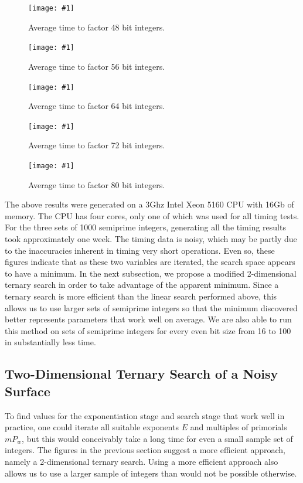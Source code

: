 \documentclass{ucalgthes1}
\theoremstyle{definition}
\newcommand{\mygraphXPNG}[4]{
	\begin{figure}[htb]
	\centering
	\texttt{[image: \#1]}
	\caption[#4]{#3}
	\label{#2}
	\end{figure}
}
\begin{document}
\mygraphXPNG{bits-48-3d.png}{fig:search48td}{Average time to factor 48 bit integers.}{48 bit Factoring Search Space.}
\mygraphXPNG{bits-56-3d.png}{fig:search56td}{Average time to factor 56 bit integers.}{56 bit Factoring Search Space.}
\mygraphXPNG{bits-64-3d.png}{fig:search64td}{Average time to factor 64 bit integers.}{64 bit Factoring Search Space.}
\mygraphXPNG{bits-72-3d.png}{fig:search72td}{Average time to factor 72 bit integers.}{72 bit Factoring Search Space.}
\mygraphXPNG{bits-80-3d.png}{fig:search80td}{Average time to factor 80 bit integers.}{80 bit Factoring Search Space.}

\clearpage

The above results were generated on a 3Ghz Intel Xeon 5160 CPU with 16Gb of memory.  The CPU has four cores, only one of which was used for all timing tests.  For the three sets of 1000 semiprime integers, generating all the timing results took approximately one week.  The timing data is noisy, which may be partly due to the inaccuracies inherent in timing very short operations.  Even so, these figures indicate that as these two variables are iterated, the search space appears to have a minimum.  In the next subsection, we propose a modified 2-dimensional ternary search in order to take advantage of the apparent minimum.  Since a ternary search is more efficient than the linear search performed above, this allows us to use larger sets of semiprime integers so that the minimum discovered better represents parameters that work well on average.  We are also able to run this method on sets of semiprime integers for every even bit size from 16 to 100 in substantially less time.



\subsection{Two-Dimensional Ternary Search of a Noisy Surface}
\label{subsec:ssparNoisyCurve}

\newcommand{\xmin}{x_{\textrm{min}}}
\newcommand{\xmax}{x_{\textrm{max}}}
\newcommand{\xlo}{x_{\textrm{lo}}}
\newcommand{\xhi}{x_{\textrm{hi}}}
\newcommand{\xonethird}{x_\ell}
\newcommand{\xtwothird}{x_h}
\newcommand{\ymin}{y_{\textrm{min}}}
\newcommand{\ymax}{y_{\textrm{max}}}
\newcommand{\ylo}{y_{\textrm{lo}}}
\newcommand{\yhi}{y_{\textrm{hi}}}
\newcommand{\yonethird}{y_\ell}
\newcommand{\ytwothird}{y_h}
\newcommand{\tonethird}{t_\ell}
\newcommand{\ttwothird}{t_h}
\newcommand{\timefnc}{\mathcal T}

To find values for the exponentiation stage and search stage that work well in practice, one could iterate all suitable exponents $E$ and multiples of primorials $mP_w$, but this would conceivably take a long time for even a small sample set of integers.  The figures in the previous section suggest a more efficient approach, namely a 2-dimensional ternary search.  Using a more efficient approach also allows us to use a larger sample of integers than would not be possible otherwise.
\end{document}
